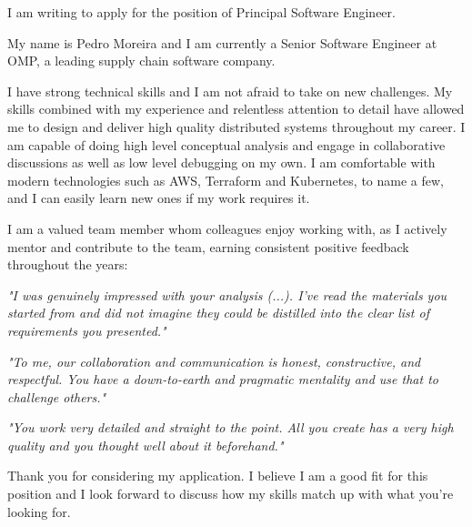 I am writing to apply for the position of Principal Software Engineer.

My name is Pedro Moreira and I am currently a Senior Software Engineer at OMP, a leading supply chain software company.

I have strong technical skills and I am not afraid to take on new challenges. My skills combined with my experience and relentless attention to detail have allowed me to design and deliver high quality distributed systems throughout my career. I am capable of doing high level conceptual analysis and engage in collaborative discussions as well as low level debugging on my own. I am comfortable with modern technologies such as AWS, Terraform and Kubernetes, to name a few, and I can easily learn new ones if my work requires it.

I am a valued team member whom colleagues enjoy working with, as I actively mentor and contribute to the team, earning consistent positive feedback throughout the years:

\emph{"I was genuinely impressed with your analysis (...). I've read the materials you started from and did not imagine they could be distilled into the clear list of requirements you presented."}

\emph{"To me, our collaboration and communication is honest, constructive, and respectful. You have a down-to-earth and pragmatic mentality and use that to challenge others."}

\emph{"You work very detailed and straight to the point. All you create has a very high quality and you thought well about it beforehand."}

Thank you for considering my application. I believe I am a good fit for this position and I look forward to discuss how my skills match up with what you're looking for.
